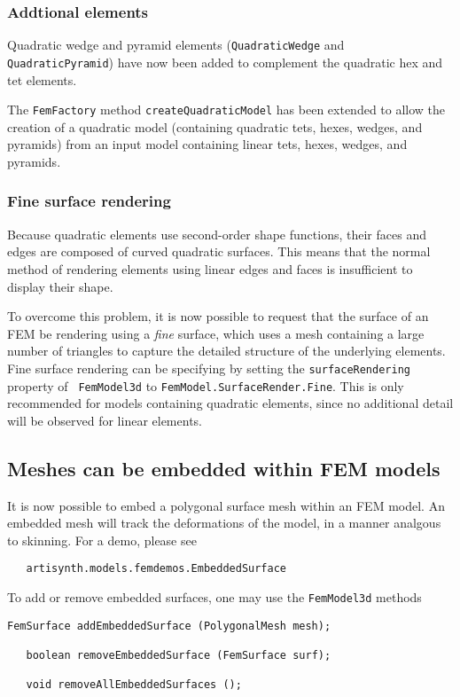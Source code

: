 \documentclass{article}
\begin{document}
\subsubsection*{Addtional elements}

Quadratic wedge and pyramid elements ({\tt QuadraticWedge} and {\tt
QuadraticPyramid}) have now been added to complement the quadratic hex
and tet elements.

The {\tt FemFactory} method {\tt createQuadraticModel} has been
extended to allow the creation of a quadratic model (containing
quadratic tets, hexes, wedges, and pyramids) from an input model
containing linear tets, hexes, wedges, and pyramids.

\subsubsection*{Fine surface rendering}

Because quadratic elements use second-order shape functions, their
faces and edges are composed of curved quadratic surfaces. This means
that the normal method of rendering elements using linear edges and
faces is insufficient to display their shape. 

To overcome this problem, it is now possible to request that the
surface of an FEM be rendering using a {\it fine} surface, which uses
a mesh containing a large number of triangles to capture the detailed
structure of the underlying elements. Fine surface rendering can be
specifying by setting the {\tt surfaceRendering} property of {\tt
FemModel3d} to {\tt FemModel.SurfaceRender.Fine}. This is only
recommended for models containing quadratic elements, since no additional
detail will be observed for linear elements.

\subsection*{Meshes can be embedded within FEM models}

It is now possible to embed a polygonal surface mesh within an FEM
model. An embedded mesh will track the deformations of the model, in a
manner analgous to skinning. For a demo, please see
\begin{verbatim}
   artisynth.models.femdemos.EmbeddedSurface
\end{verbatim}

To add or remove embedded surfaces, one may use the {\tt FemModel3d}
methods
\begin{lstlisting}[]
   FemSurface addEmbeddedSurface (PolygonalMesh mesh);

   boolean removeEmbeddedSurface (FemSurface surf);

   void removeAllEmbeddedSurfaces ();
\end{lstlisting}
\end{document}
